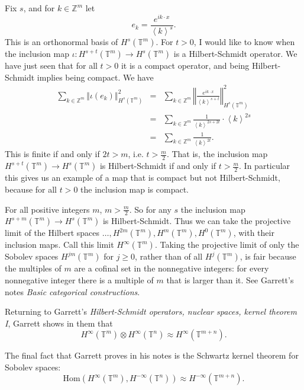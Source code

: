 \documentclass{article}
\newcommand{\jap}[1]{\left\langle #1 \right\rangle}
\newcommand{\Hom}{\textrm{Hom}}
\newcommand{\norm}[1]{\left\Vert #1 \right\Vert}
\begin{document}
Fix $s$, and
for $k \in \mathbb{Z}^m$ let
\[
e_k = \frac{e^{ik\cdot x}}{\jap{k}^s}.
\]
This is an orthonormal basis of $H^s(\mathbb{T}^m)$. For $t >0$, I would like to know when the inclusion map $\iota:H^{s+t}(\mathbb{T}^m) \to H^s(\mathbb{T}^m)$ is
a Hilbert-Schmidt operator. We have just seen that for all $t>0$ it is a compact operator, and being Hilbert-Schmidt implies being compact. We have
\begin{eqnarray*}
\sum_{k \in \mathbb{Z}^m} \norm{\iota(e_k)}^2_{H^s(\mathbb{T}^m)}&=&\sum_{k \in \mathbb{Z}^m} \norm{\frac{e^{ik\cdot x}}{\jap{k}^{s+t}}}^2_{H^s(\mathbb{T}^m)}\\
&=&\sum_{k \in \mathbb{Z}^m} \frac{1}{\jap{k}^{2s+2t}} \cdot \jap{k}^{2s}\\
&=&\sum_{k \in \mathbb{Z}^m} \frac{1}{\jap{k}^{2t}}.
\end{eqnarray*}
This is finite if and only if $2t>m$, i.e. $t>\frac{m}{2}$. That is, the inclusion map $H^{s+t}(\mathbb{T}^m) \to H^s(\mathbb{T}^m)$ is Hilbert-Schmidt if and only if
$t>\frac{m}{2}$. In particular this gives us an example of a map that is compact but not Hilbert-Schmidt, because for all $t>0$ the inclusion map is compact.

For all positive integers $m$, $m>\frac{m}{2}$. So for any $s$ the inclusion map $H^{s+m}(\mathbb{T}^m) \to H^s(\mathbb{T}^m)$ is Hilbert-Schmidt. 
Thus we can take the projective limit of the Hilbert spaces $\ldots, H^{2m}(\mathbb{T}^m), H^m(\mathbb{T}^m), H^0(\mathbb{T}^m)$, with their inclusion
maps. Call this limit $H^\infty(\mathbb{T}^m)$. Taking the projective limit of only the Sobolev spaces $H^{jm}(\mathbb{T}^m)$ for $j \geq 0$, rather than of all 
$H^j(\mathbb{T}^m)$,  is fair because the multiples of $m$ are a cofinal set in the nonnegative integers: for every nonnegative integer there is a multiple
of $m$ that is larger than it. See Garrett's notes {\em Basic categorical constructions}. 

Returning to Garrett's {\em Hilbert-Schmidt operators, nuclear spaces, kernel theorem I}, 
Garrett shows in them that
\[
H^\infty(\mathbb{T}^m) \otimes  H^\infty (\mathbb{T}^n) \approx H^\infty(\mathbb{T}^{m+n}).
\]

The final fact that Garrett proves in his notes is the Schwartz kernel theorem for Sobolev spaces:
\[
\Hom(H^\infty(\mathbb{T}^m),H^{-\infty}(\mathbb{T}^n)) \approx H^{-\infty}(\mathbb{T}^{m+n}).
\]
\end{document}
